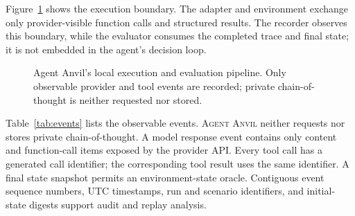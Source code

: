 \documentclass[preprint,12pt]{elsarticle}
\newcommand{\system}{\textsc{Agent Anvil}}
\begin{document}
Figure~\ref{fig:architecture} shows the execution boundary. The adapter and environment exchange only provider-visible function calls and structured results. The recorder observes this boundary, while the evaluator consumes the completed trace and final state; it is not embedded in the agent's decision loop.

\begin{figure}[htbp]
\centering
{}
\caption{Agent Anvil's local execution and evaluation pipeline. Only observable provider and tool events are recorded; private chain-of-thought is neither requested nor stored.}
\label{fig:architecture}
\end{figure}

Table~\ref{tab:events} lists the observable events. \system{} neither requests nor stores private chain-of-thought. A model response event contains only content and function-call items exposed by the provider API. Every tool call has a generated call identifier; the corresponding tool result uses the same identifier. A final state snapshot permits an environment-state oracle. Contiguous event sequence numbers, UTC timestamps, run and scenario identifiers, and initial-state digests support audit and replay analysis.
\end{document}
